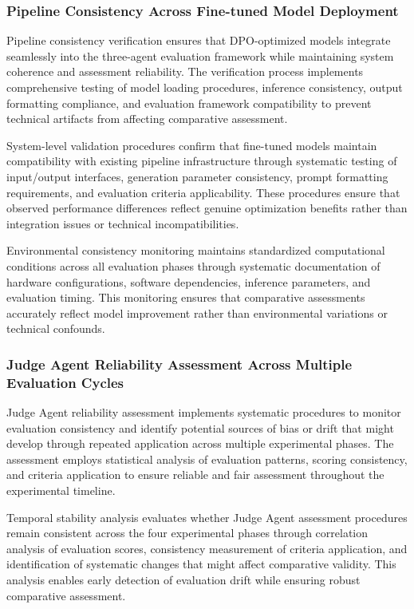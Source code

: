 \subsubsection{Pipeline Consistency Across Fine-tuned Model Deployment}

Pipeline consistency verification ensures that DPO-optimized models integrate seamlessly into the three-agent evaluation framework while maintaining system coherence and assessment reliability. The verification process implements comprehensive testing of model loading procedures, inference consistency, output formatting compliance, and evaluation framework compatibility to prevent technical artifacts from affecting comparative assessment.

System-level validation procedures confirm that fine-tuned models maintain compatibility with existing pipeline infrastructure through systematic testing of input/output interfaces, generation parameter consistency, prompt formatting requirements, and evaluation criteria applicability. These procedures ensure that observed performance differences reflect genuine optimization benefits rather than integration issues or technical incompatibilities.

Environmental consistency monitoring maintains standardized computational conditions across all evaluation phases through systematic documentation of hardware configurations, software dependencies, inference parameters, and evaluation timing. This monitoring ensures that comparative assessments accurately reflect model improvement rather than environmental variations or technical confounds.

\subsubsection{Judge Agent Reliability Assessment Across Multiple Evaluation Cycles}

Judge Agent reliability assessment implements systematic procedures to monitor evaluation consistency and identify potential sources of bias or drift that might develop through repeated application across multiple experimental phases. The assessment employs statistical analysis of evaluation patterns, scoring consistency, and criteria application to ensure reliable and fair assessment throughout the experimental timeline.

Temporal stability analysis evaluates whether Judge Agent assessment procedures remain consistent across the four experimental phases through correlation analysis of evaluation scores, consistency measurement of criteria application, and identification of systematic changes that might affect comparative validity. This analysis enables early detection of evaluation drift while ensuring robust comparative assessment.

